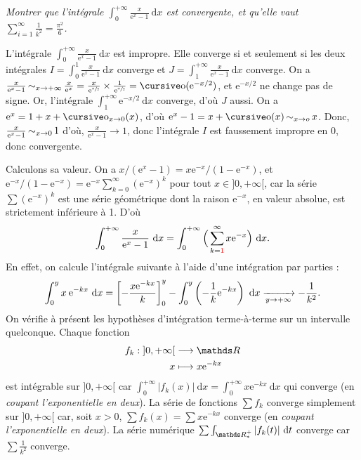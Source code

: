 \begin{exo}
	\textsl{Montrer que l'intégrale $\int_{0}^{+\infty} \frac{x}{\mathrm{e}^x - 1}~\mathrm{d}x$\/ est convergente, et qu'elle vaut $\sum_{i=1}^\infty \frac{1}{k^2} = \frac{\pi^2}{6}$.}

	L'intégrale $\int_{0}^{+\infty} \frac{x}{\mathrm{e}^x - 1}~\mathrm{d}x$\/ est impropre. Elle converge si et seulement si les deux intégrales $I = \int_{0}^{1} \frac{x}{\mathrm{e}^{x}-1}~\mathrm{d}x$\/ converge et $J = \int_{1}^{+\infty}\frac{x}{\mathrm{e}^{x}-1} ~\mathrm{d}x$\/ converge.
	On a $\frac{x}{\mathrm{e}^{x}-1} \simi_{x\to +\infty} \frac{x}{\mathrm{e}^{x}} = \frac{x}{\mathrm{e}^{\sfrac{x}{2}}} \times \frac{1}{\mathrm{e}^{\sfrac{x}{2}}} = \po(\mathrm{e}^{-x / 2})$, et $\mathrm{e}^{-x / 2}$\/ ne change pas de signe. Or, l'intégrale $\int_{1}^{+\infty} \mathrm{e}^{-x/2}~\mathrm{d}x$\/ converge, d'où $J$\/ aussi.
	On a $\mathrm{e}^x = 1 + x + \po_{x\to 0}(x)$, d'où $\mathrm{e}^{x}-1 = x + \po(x) \simi_{x\to o} x$. Donc, $\frac{x}{\mathrm{e}^{x}-1} \operatorname*{\sim}_{x\to 0} 1$\/ d'où, $\frac{x}{\mathrm{e}^{x}-1} \longrightarrow 1$, donc l'intégrale $I$\/ est faussement impropre en 0, donc convergente.

	Calculons sa valeur. On a $x/(\mathrm{e}^x-1) = x \mathrm{e}^{-x} / (1 - \mathrm{e}^{-x})$, et $\mathrm{e}^{-x} / (1-\mathrm{e}^{-x}) = \mathrm{e}^{-x} \sum_{k=0}^\infty (\mathrm{e}^{-x})^k$\/ pour tout $x \in {]0,+\infty[}$, car la série $\sum (\mathrm{e}^{-x})^k$\/ est une série géométrique dont la raison $\mathrm{e}^{-x}$, en valeur absolue, est strictement inférieure à 1. D'où \[
		\int_{0}^{+\infty} \frac{x}{\mathrm{e}^{x}-1}~\mathrm{d}x = \int_{0}^{+\infty} \Big(\sum_{k={\color{red}1}}^\infty x \mathrm{e}^{-x}\Big)~\mathrm{d}x 
	.\] En effet, on calcule l'intégrale suivante à l'aide d'une intégration par parties : \[
		\int_{0}^{y} x \: \mathrm{e}^{-kx}~\mathrm{d}x = \left[ -\frac{x \mathrm{e}^{-kx}}{k} \right]_0^{y} - \int_{0}^{y} \left( -\frac{1}{k} \mathrm{e}^{-kx} \right) ~\mathrm{d}x \xrightarrow[y\to +\infty]{} -\frac{1}{k^2}
	.\] On vérifie à présent les hypothèses d'intégration terme-à-terme sur un intervalle quelconque. Chaque fonction \begin{align*}
		f_k: {]0,+\infty[} &\longrightarrow \R \\
		x &\longmapsto x \mathrm{e}^{-kx}
	\end{align*} est intégrable sur $]0,+\infty[$\/ car $\int_{0}^{+\infty} |f_k(x)|~\mathrm{d}x = \int_{0}^{+\infty} x \mathrm{e}^{-kx}~\mathrm{d}x$\/ qui converge (en \textsl{coupant l'exponentielle en deux}). La série de fonctions $\sum f_k$\/ converge simplement sur $]0,+\infty[$\/ car, soit $x > 0$, $\sum f_k(x) = \sum x \mathrm{e}^{-kx}$\/ converge (en \textsl{coupant l'exponentielle en deux}). La série numérique $\sum \int_{\R^+_*} |f_k(t)|~\mathrm{d}t$\/ converge car $\sum \frac{1}{k^2}$\/ converge.
\end{exo}

